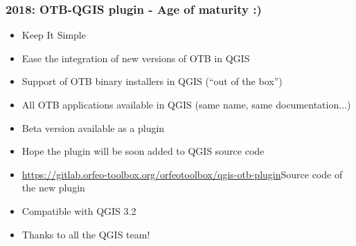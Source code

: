 \begin{frame}
  \frametitle{2018: OTB-QGIS plugin - Age of maturity :)}
  \begin{itemize}
  \item Keep It Simple
  \item Ease the integration of new versions of OTB in QGIS
  \item Support of OTB binary installers in QGIS (``out of the box'')
  \item All OTB applications available in QGIS (same name, same documentation...)  
  \item \alert{Beta version} available as a plugin
  \item Hope the plugin will be soon added to QGIS source code
  \item
    \href{https://gitlab.orfeo-toolbox.org/orfeotoolbox/qgis-otb-plugin}{https://gitlab.orfeo-toolbox.org/orfeotoolbox/qgis-otb-plugin}{Source
    code of the new plugin}
  \item Compatible with QGIS 3.2
  \item Thanks to all the QGIS team!
  \end{itemize}
\end{frame}

